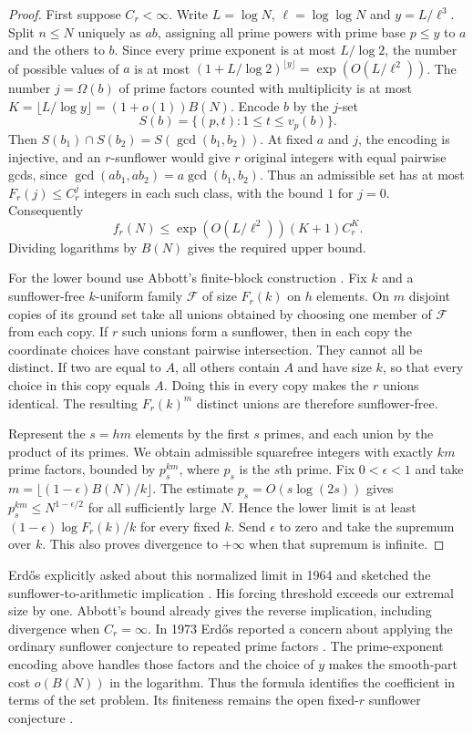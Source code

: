 \documentclass[11pt,a4paper]{article}
\begin{document}
\begin{proof}
First suppose $C_r<\infty$. Write $L=\log N$, $\ell=\log\log N$ and
$y=L/\ell^3$. Split $n\le N$ uniquely as $ab$, assigning all prime powers
with prime base $p\le y$ to $a$ and the others to $b$. Since every prime
exponent is at most $L/\log 2$, the number of possible values of $a$ is at
most $(1+L/\log 2)^{\lfloor y\rfloor}=\exp(O(L/\ell^2))$. The number
$j=\Omega(b)$ of prime factors counted with multiplicity is at most
$K=\lfloor L/\log y\rfloor=(1+o(1))B(N)$. Encode $b$ by the $j$-set
\[
 S(b)=\{(p,t):1\le t\le v_p(b)\}.
\]
Then $S(b_1)\cap S(b_2)=S(\gcd(b_1,b_2))$. At fixed $a$ and $j$,
the encoding is injective, and an $r$-sunflower would give $r$ original
integers with equal pairwise gcds, since $\gcd(ab_1,ab_2)=a\gcd(b_1,b_2)$.
Thus an admissible set has at most $F_r(j)\le C_r^j$ integers in each
such class, with the bound $1$ for $j=0$. Consequently
\[
 f_r(N)\le\exp(O(L/\ell^2))(K+1)C_r^K.
\]
Dividing logarithms by $B(N)$ gives the required upper bound.

For the lower bound use Abbott's finite-block construction
\cite[p.~159, (7)]{gcdAbbott66}. Fix $k$ and a sunflower-free $k$-uniform
family $\mathcal F$ of size $F_r(k)$ on $h$ elements. On $m$ disjoint
copies of its ground set take all unions obtained by choosing one member
of $\mathcal F$ from each copy. If $r$ such unions form a sunflower,
then in each copy the coordinate choices have constant pairwise
intersection. They cannot all be distinct. If two are equal to $A$,
all others contain $A$ and have size $k$, so that every choice in this
copy equals $A$. Doing this in every copy makes the $r$ unions identical.
The resulting $F_r(k)^m$ distinct unions are therefore sunflower-free.

Represent the $s=hm$ elements by the first $s$ primes, and each union by
the product of its primes. We obtain admissible squarefree integers with
exactly $km$ prime factors, bounded by $p_s^{km}$, where $p_s$ is the
$s$th prime. Fix $0<\epsilon<1$ and take
$m=\lfloor(1-\epsilon)B(N)/k\rfloor$. The estimate $p_s=O(s\log(2s))$
gives $p_s^{km}\le N^{1-\epsilon/2}$ for all sufficiently large $N$.
Hence the lower limit is at least $(1-\epsilon)\log F_r(k)/k$ for every
fixed $k$. Send $\epsilon$ to zero and take the supremum over $k$. This
also proves divergence to $+\infty$ when that supremum is infinite.
\end{proof}

Erd\H{o}s explicitly asked about this normalized limit in 1964 and
sketched the sunflower-to-arithmetic implication
\cite[pp.~645--646, (7)--(8)]{gcdErdos64}. His forcing threshold exceeds
our extremal size by one. Abbott's bound already gives the reverse
implication, including divergence when $C_r=\infty$. In 1973 Erd\H{o}s
reported a concern about applying the ordinary sunflower conjecture to
repeated prime factors \cite[Sec.~4]{gcdErdos73}. The prime-exponent
encoding above handles those factors and the choice of $y$ makes the
smooth-part cost $o(B(N))$ in the logarithm. Thus the formula identifies
the coefficient in terms of the set problem. Its finiteness remains the
open fixed-$r$ sunflower conjecture \cite{gcdRao26}.
\end{document}
